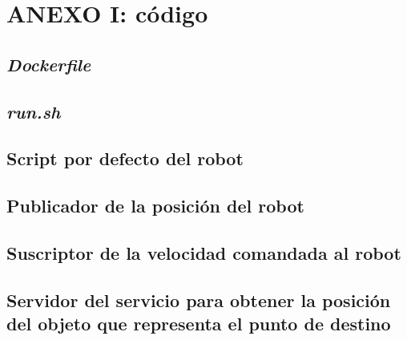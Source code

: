 \section*{ANEXO I: código}

\subsection*{\textit{Dockerfile}}


\subsection*{\textit{run.sh}}


\subsection*{Script por defecto del robot}


\subsection*{Publicador de la posición del robot}


\subsection*{Suscriptor de la velocidad comandada al robot}


\subsection*{Servidor del servicio para obtener la posición del objeto que representa el punto de destino}


